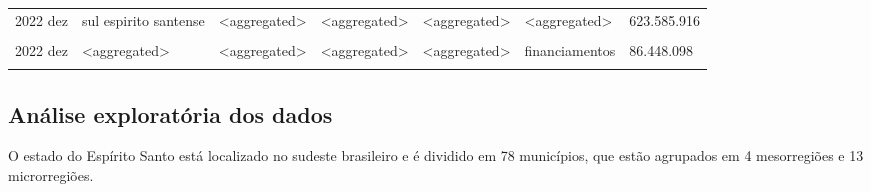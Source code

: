 \documentclass[
  12pt,
  twoside,
  openright,
  a4paper,
  chapter=TITLE,
  section=TITLE,
  brazil]{abntex2}
\begin{document}
\begin{table}
{{\begin{tabular}[t]{lllllll}
2022 dez & sul espirito santense & <aggregated> & <aggregated> & <aggregated> & <aggregated> & 623.585.916\\
\addlinespace
\cellcolor{gray!6}{2022 dez} & \cellcolor{gray!6}{<aggregated>} & \cellcolor{gray!6}{<aggregated>} & \cellcolor{gray!6}{<aggregated>} & \cellcolor{gray!6}{<aggregated>} & \cellcolor{gray!6}{emprestimos e titulos descontados} & \cellcolor{gray!6}{4.150.513.082}\\
2022 dez & <aggregated> & <aggregated> & <aggregated> & <aggregated> & financiamentos & 86.448.098\\
\cellcolor{gray!6}{2022 dez} & \cellcolor{gray!6}{<aggregated>} & \cellcolor{gray!6}{<aggregated>} & \cellcolor{gray!6}{<aggregated>} & \cellcolor{gray!6}{<aggregated>} & \cellcolor{gray!6}{<aggregated>} & \cellcolor{gray!6}{4.236.961.180}\\
\bottomrule
\end{tabular}}

}

\end{table}%

\subsection{Análise exploratória dos
dados}\label{anuxe1lise-exploratuxf3ria-dos-dados}

O estado do Espírito Santo está localizado no sudeste brasileiro e é
dividido em 78 municípios, que estão agrupados em 4 mesorregiões e 13
microrregiões.
\end{document}
